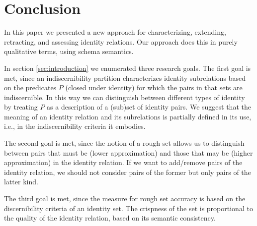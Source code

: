 \section{Conclusion}
\label{sec:conclusion}

In this paper we presented a new approach for characterizing,
  extending, retracting, and assessing identity relations.
Our approach does this in purely qualitative terms, using schema semantics.

In section \ref{sec:introduction} we enumerated three research goals.
The first goal is met, since an indiscernibility partition characterizes
  identity subrelations based on the predicates $P$ (closed under identity)
  for which the pairs in that sets are indiscernible.
In this way we can distinguish between different types of identity
  by treating $P$ as a description of a (sub)set of identity pairs.
We suggest that the meaning of an identity relation and its subrelations
  is partially defined in its use,
  i.e., in the indiscernibility criteria it embodies.

The second goal is met, since the notion of a rough set allows us to
  distinguish between pairs that must be (lower approximation)
  and those that may be (higher approximation)
  in the identity relation.
If we want to add/remove pairs of the identity relation,
  we should not consider pairs of the former but only pairs of
  the latter kind.

The third goal is met, since the measure for rough set accuracy
  is based on the discernibility criteria of an identity set.
The crispness of the set is proportional to the quality of the
  identity relation, based on its semantic consistency.

